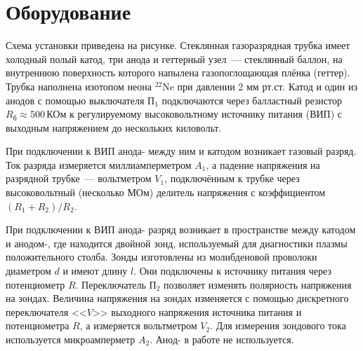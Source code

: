 \section{Оборудование}
\begin{figure}[ht!]
\end{figure}

Схема установки приведена на рисунке. Стеклянная газоразрядная трубка имеет холодный полый катод, три анода и геттерный узел~--- 
стеклянный баллон, на внутреннюю поверхность которого напылена газопоглощающая плёнка (геттер). Трубка наполнена изотопом неона
$^{22}\text{Ne}$ при давлении 2 мм рт.ст. Катод и один из анодов с помощью выключателя $\text{П}_{1}$  подключаются через балластный резистор
$R_{\text{б}}\approx 500\,\text{КОм}$ к регулируемому высоковольтному источнику питания (ВИП) с выходным напряжением до нескольких киловольт.

При подключении к ВИП анода- между  ним и катодом возникает газовый разряд. Ток разряда измеряется миллиамперметром $A_{1}$,
а падение напряжения на разрядной трубке~--- вольтметром $V_{1}$, подключённым к трубке через высоковольтный (несколько МОм) делитель
напряжения с коэффициентом $\left(R_{1} + R_{2}\right)/R_{2}$.

При подключении к ВИП анода- разряд возникает в пространстве между катодом и анодом-, где  находится двойной зонд, используемый
для диагностики плазмы положительного столба. Зонды изготовлены из молибденовой проволоки диаметром $d$ и имеют длину $l$.
Они подключены к источнику питания через потенциометр $R$. Переключатель $\text{П}_{2}$ позволяет изменять полярность напряжения на зондах.
Величина напряжения на зондах изменяется с помощью дискретного переключателя <<$V$>> выходного напряжения источника питания и потенциометра $R$,
а измеряется вольтметром $V_{2}$. Для измерения зондового тока используется микроамперметр $A_{2}$. Анод- в работе не используется.

